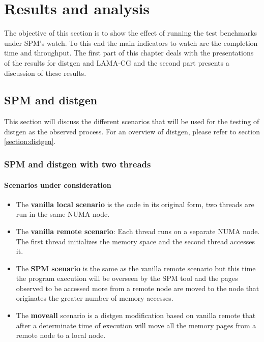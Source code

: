 \chapter{Results and analysis}\label{chapter:res-analysis}
The objective of this section is to show the effect of running the test benchmarks under SPM's watch. To this end the main indicators to watch are the completion time and throughput. The first part of this chapter deals with the presentations of the results for distgen and LAMA-CG and the second part presents a discussion of these results.
 
\section{SPM and distgen}\label{section:spmydistgen}
This section will discuss the different scenarios that will be used for the testing of distgen as the observed process. For an overview of distgen, please refer to section \ref{section:distgen}.
\subsection{SPM and distgen with two threads}\label{subsection:res-spmydistgen-2t}

\subsubsection{Scenarios under consideration}\label{subsection:res-scenarios-2t-scens}

\begin{itemize}
	\item The \textbf{vanilla local scenario} is the code in its original form, two threads are run in the same NUMA node.
	\item The \textbf{vanilla remote scenario}: Each thread runs on a separate NUMA node. The first thread initializes the memory space and the second thread accesses it. 
	\item The \textbf{SPM scenario} is the same as the vanilla remote scenario but this time the program execution will be overseen by the SPM tool and the pages observed to be accessed more from a remote node are moved to the node that originates the greater number of memory accesses.
	\item The \textbf{moveall} scenario is a distgen modification based on vanilla remote that after a determinate time of execution will move all the memory pages from a remote node to a local node.
\end{itemize}

